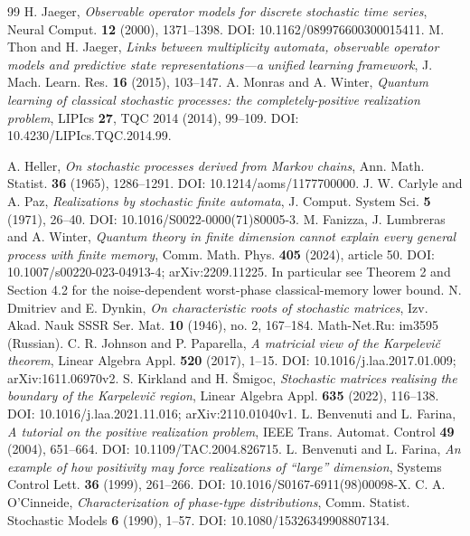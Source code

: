 \begin{thebibliography}{99}
 H. Jaeger, \emph{Observable operator models for discrete stochastic time series}, Neural Comput. \textbf{12} (2000), 1371--1398. DOI: 10.1162/089976600300015411.
 M. Thon and H. Jaeger, \emph{Links between multiplicity automata, observable operator models and predictive state representations---a unified learning framework}, J. Mach. Learn. Res. \textbf{16} (2015), 103--147.
 A. Monras and A. Winter, \emph{Quantum learning of classical stochastic processes: the completely-positive realization problem}, LIPIcs \textbf{27}, TQC 2014 (2014), 99--109. DOI: 10.4230/LIPIcs.TQC.2014.99.

 A. Heller, \emph{On stochastic processes derived from Markov chains}, Ann. Math. Statist. \textbf{36} (1965), 1286--1291. DOI: 10.1214/aoms/1177700000.
 J. W. Carlyle and A. Paz, \emph{Realizations by stochastic finite automata}, J. Comput. System Sci. \textbf{5} (1971), 26--40. DOI: 10.1016/S0022-0000(71)80005-3.
 M. Fanizza, J. Lumbreras and A. Winter, \emph{Quantum theory in finite dimension cannot explain every general process with finite memory}, Comm. Math. Phys. \textbf{405} (2024), article 50. DOI: 10.1007/s00220-023-04913-4; arXiv:2209.11225. In particular see Theorem 2 and Section 4.2 for the noise-dependent worst-phase classical-memory lower bound.
 N. Dmitriev and E. Dynkin, \emph{On characteristic roots of stochastic matrices}, Izv. Akad. Nauk SSSR Ser. Mat. \textbf{10} (1946), no. 2, 167--184. Math-Net.Ru: im3595 (Russian).
 C. R. Johnson and P. Paparella, \emph{A matricial view of the Karpelevi\v c theorem}, Linear Algebra Appl. \textbf{520} (2017), 1--15. DOI: 10.1016/j.laa.2017.01.009; arXiv:1611.06970v2.
 S. Kirkland and H. \v Smigoc, \emph{Stochastic matrices realising the boundary of the Karpelevi\v c region}, Linear Algebra Appl. \textbf{635} (2022), 116--138. DOI: 10.1016/j.laa.2021.11.016; arXiv:2110.01040v1.
 L. Benvenuti and L. Farina, \emph{A tutorial on the positive realization problem}, IEEE Trans. Automat. Control \textbf{49} (2004), 651--664. DOI: 10.1109/TAC.2004.826715.
 L. Benvenuti and L. Farina, \emph{An example of how positivity may force realizations of ``large'' dimension}, Systems Control Lett. \textbf{36} (1999), 261--266. DOI: 10.1016/S0167-6911(98)00098-X.
 C. A. O'Cinneide, \emph{Characterization of phase-type distributions}, Comm. Statist. Stochastic Models \textbf{6} (1990), 1--57. DOI: 10.1080/15326349908807134.

\end{thebibliography}
